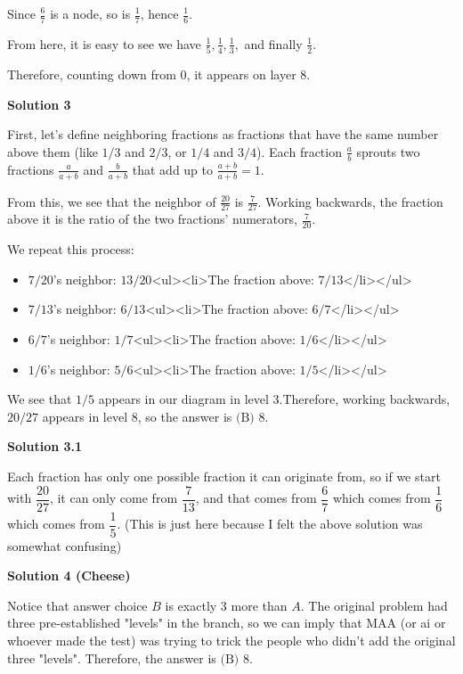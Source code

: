 \begin{enumerate}
 Since $\frac{6}{7}$ is a node, so is $\frac{1}{7}$, hence $\frac{1}{6}$.

 From here, it is easy to see we have $\frac{1}{5}, \frac{1}{4}, \frac{1}{3},$ and finally $\frac{1}{2}$.

 Therefore, counting down from 0, it appears on layer $\boxed{8}$.

 



\textbf{Solution 3}

First, let's define neighboring fractions as fractions that have the same number above them (like $1/3$ and $2/3$, or $1/4$ and $3/4$). Each fraction $\frac{a}{b}$ sprouts two fractions $\frac{a}{a+b}$ and $\frac{b}{a+b}$ that add up to $\frac{a+b}{a+b}=1$.

 From this, we see that the neighbor of $\frac{20}{27}$ is $\frac{7}{27}$. Working backwards, the fraction above it is the ratio of the two fractions' numerators, $\frac{7}{20}$.

 We repeat this process:

 
            \begin{itemize}
        \item $7/20$'s neighbor: $13/20$<ul><li>The fraction above: $7/13$</li></ul>
        \item $7/13$'s neighbor: $6/13$<ul><li>The fraction above: $6/7$</li></ul>
        \item $6/7$'s neighbor: $1/7$<ul><li>The fraction above: $1/6$</li></ul>
        \item $1/6$'s neighbor: $5/6$<ul><li>The fraction above: $1/5$</li></ul>
            \end{itemize}
            We see that $1/5$ appears in our diagram in level 3.Therefore, working backwards, $20/27$ appears in level 8, so the answer is $\boxed{\text{(B) 8}}$.

 



\textbf{Solution 3.1}

Each fraction has only one possible fraction it can originate from, so if we start with $\dfrac{20}{27}$, it can only come from $\dfrac{7}{13}$, and that comes from $\dfrac{6}{7}$ which comes from $\dfrac{1}{6}$ which comes from $\dfrac{1}{5}$. (This is just here because I felt the above solution was somewhat confusing)

 



\textbf{Solution 4 (Cheese)}

Notice that answer choice $B$ is exactly 3 more than $A$. The original problem had three pre-established "levels" in the branch, so we can imply that MAA (or ai or whoever made the test) was trying to trick the people who didn't add the original three "levels". Therefore, the answer is $\boxed{\text{(B) 8}}$.


\end{enumerate}
